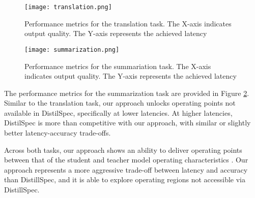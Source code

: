 \begin{figure}[h!]
    \centering
    \texttt{[image: translation.png]}
    \caption{Performance metrics for the translation task. The X-axis indicates output quality. The Y-axis represents the achieved latency}
    \label{fig:translation}
\end{figure}


\begin{figure}[h!]
    \centering
    \texttt{[image: summarization.png]}
    \caption{Performance metrics for the summariation task. The X-axis indicates output quality. The Y-axis represents the achieved latency}
    \label{fig:summarization}
\end{figure}

The performance metrics for the summarization task are provided in Figure \ref{fig:summarization}. Similar to the translation task, our approach unlocks operating points not available in DistilSpec, specifically at lower latencies. At higher latencies, DistilSpec is more than competitive with our approach, with similar or slightly better latency-accuracy trade-offs.

Across both tasks, our approach shows an ability to deliver operating points between that of the student and teacher model operating characteristics . Our approach represents a more aggressive trade-off between latency and accuracy than DistillSpec, and it is able to explore operating regions not accessible via DistillSpec.
